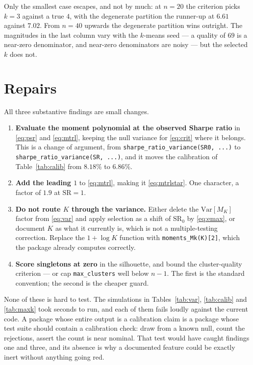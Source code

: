 \documentclass[11pt,a4paper]{article}
\newcommand{\code}[1]{\texttt{#1}}
\newcommand{\SR}{\mathrm{SR}}
\begin{document}
Only the smallest case escapes, and not by much: at $n = 20$ the criterion
picks $k = 3$ against a true $4$, with the degenerate partition the runner-up
at $6.61$ against $7.02$. From $n = 40$ upwards the degenerate partition wins
outright. The magnitudes in the last column vary with the $k$-means seed --- a
quality of $69$ is a near-zero denominator, and near-zero denominators are
noisy --- but the selected $k$ does not.

\section{Repairs}
\label{sec:fixes}

All three substantive findings are small changes.

\begin{enumerate}
  \item \textbf{Evaluate the moment polynomial at the observed Sharpe ratio}
        in \eqref{eq:psr} and \eqref{eq:mtrl}, keeping the null variance for
        \eqref{eq:crit} where it belongs. This is a change of argument, from
        \code{sharpe\_ratio\_variance(SR0, ...)} to
        \code{sharpe\_ratio\_variance(SR, ...)}, and it moves the calibration
        of Table~\ref{tab:calib} from $8.18\%$ to $6.86\%$.
  \item \textbf{Add the leading $1$} to \eqref{eq:mtrl}, making it
        \eqref{eq:mtrlstar}. One character, a factor of $1.9$ at $\SR = 1$.
  \item \textbf{Do not route $K$ through the variance.} Either delete the
        $\mathrm{Var}[M_K]$ factor from \eqref{eq:var} and apply selection as
        a shift of $\SR_0$ by \eqref{eq:emax}, or document $K$ as what it
        currently is, which is not a multiple-testing correction. Replace the
        $1 + \log K$ function with \code{moments\_Mk(K)[2]}, which the package
        already computes correctly.
  \item \textbf{Score singletons at zero} in the silhouette, and bound the
        cluster-quality criterion --- or cap \code{max\_clusters} well below
        $n - 1$. The first is the standard convention; the second is the
        cheaper guard.
\end{enumerate}

None of these is hard to test. The simulations in Tables~\ref{tab:var},
\ref{tab:calib} and \ref{tab:maxk} took seconds to run, and each of them
fails loudly against the current code. A package whose entire output is a
calibration claim is a package whose test suite should contain a calibration
check: draw from a known null, count the rejections, assert the count is near
nominal. That test would have caught findings one and three, and its absence
is why a documented feature could be exactly inert without anything going red.
\end{document}
